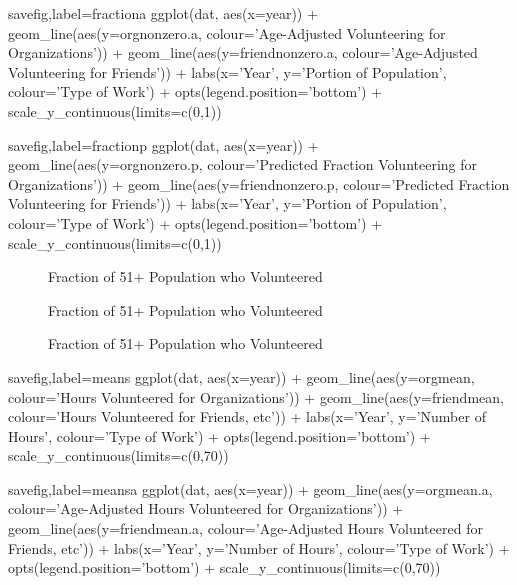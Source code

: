 \documentclass{article}
\begin{document}
\begin{Rcode}{savefig,label=fractiona}
ggplot(dat, aes(x=year)) +
geom_line(aes(y=orgnonzero.a, colour='Age-Adjusted Volunteering for Organizations')) +
geom_line(aes(y=friendnonzero.a, colour='Age-Adjusted Volunteering for Friends')) +
labs(x='Year', y='Portion of Population', colour='Type of Work') + opts(legend.position='bottom') +
scale_y_continuous(limits=c(0,1))
\end{Rcode}

\begin{Rcode}{savefig,label=fractionp}
ggplot(dat, aes(x=year)) +
geom_line(aes(y=orgnonzero.p, colour='Predicted Fraction Volunteering for Organizations')) + 
geom_line(aes(y=friendnonzero.p, colour='Predicted Fraction Volunteering for Friends')) +
labs(x='Year', y='Portion of Population', colour='Type of Work') + opts(legend.position='bottom') +
scale_y_continuous(limits=c(0,1))
\end{Rcode}

\begin{figure}[ht]
\centering
{}
\caption{Fraction of 51+ Population who Volunteered}
\end{figure}

\begin{figure}[ht]
\centering
{}
\caption{Fraction of 51+ Population who Volunteered}
\end{figure}

\begin{figure}[ht]
\centering
{}
\caption{Fraction of 51+ Population who Volunteered}
\end{figure}

\begin{Rcode}{savefig,label=means}
ggplot(dat, aes(x=year)) +
geom_line(aes(y=orgmean, colour='Hours Volunteered for Organizations')) +
geom_line(aes(y=friendmean, colour='Hours Volunteered for Friends, etc')) + 
labs(x='Year', y='Number of Hours', colour='Type of Work') + opts(legend.position='bottom') +
scale_y_continuous(limits=c(0,70))
\end{Rcode}

\begin{Rcode}{savefig,label=meansa}
ggplot(dat, aes(x=year)) +
geom_line(aes(y=orgmean.a, colour='Age-Adjusted Hours Volunteered for Organizations')) +
geom_line(aes(y=friendmean.a, colour='Age-Adjusted Hours Volunteered for Friends, etc')) + 
labs(x='Year', y='Number of Hours', colour='Type of Work') + opts(legend.position='bottom') +
scale_y_continuous(limits=c(0,70))
\end{Rcode}
\end{document}
